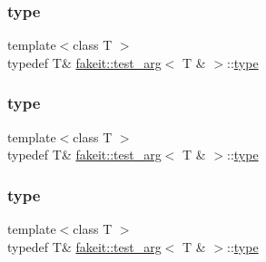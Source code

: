 \subsubsection{\texorpdfstring{type}{type}\hspace{0.1cm}{\footnotesize\ttfamily [1/9]}}
{\footnotesize\ttfamily template$<$class T $>$ \\
typedef T\& \mbox{\hyperlink{structfakeit_1_1test__arg}{fakeit\+::test\+\_\+arg}}$<$ T \& $>$\+::\mbox{\hyperlink{structfakeit_1_1test__arg_3_01T_01_6_01_4_a76c42a4147d9060cc475b5496393cec4}{type}}}

\mbox{\label{structfakeit_1_1test__arg_3_01T_01_6_01_4_a76c42a4147d9060cc475b5496393cec4}} 
\subsubsection{\texorpdfstring{type}{type}\hspace{0.1cm}{\footnotesize\ttfamily [2/9]}}
{\footnotesize\ttfamily template$<$class T $>$ \\
typedef T\& \mbox{\hyperlink{structfakeit_1_1test__arg}{fakeit\+::test\+\_\+arg}}$<$ T \& $>$\+::\mbox{\hyperlink{structfakeit_1_1test__arg_3_01T_01_6_01_4_a76c42a4147d9060cc475b5496393cec4}{type}}}

\mbox{\label{structfakeit_1_1test__arg_3_01T_01_6_01_4_a76c42a4147d9060cc475b5496393cec4}} 
\subsubsection{\texorpdfstring{type}{type}\hspace{0.1cm}{\footnotesize\ttfamily [3/9]}}
{\footnotesize\ttfamily template$<$class T $>$ \\
typedef T\& \mbox{\hyperlink{structfakeit_1_1test__arg}{fakeit\+::test\+\_\+arg}}$<$ T \& $>$\+::\mbox{\hyperlink{structfakeit_1_1test__arg_3_01T_01_6_01_4_a76c42a4147d9060cc475b5496393cec4}{type}}}

\mbox{\label{structfakeit_1_1test__arg_3_01T_01_6_01_4_a76c42a4147d9060cc475b5496393cec4}} 
